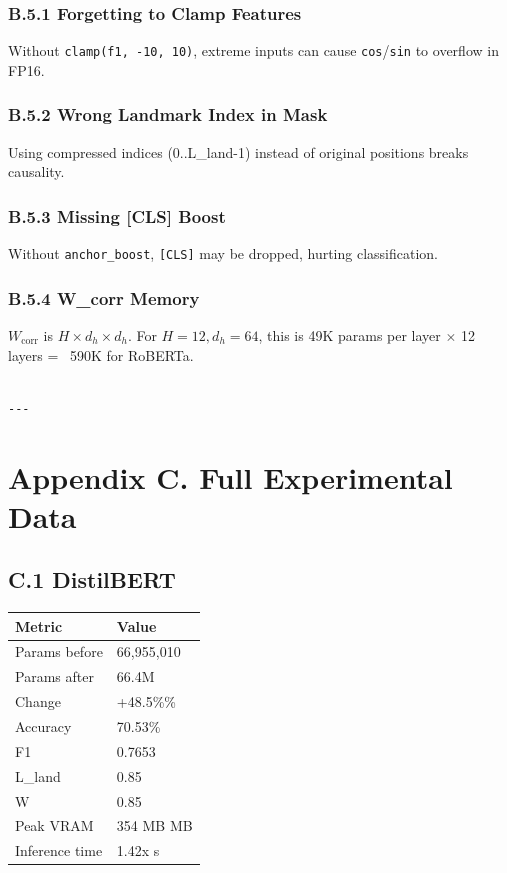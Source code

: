 \subsubsection{B.5.1 Forgetting to Clamp Features}

Without \texttt{clamp(f1, -10, 10)}, extreme inputs can cause \texttt{cos}/\texttt{sin} to 
overflow in FP16.

\subsubsection{B.5.2 Wrong Landmark Index in Mask}

Using compressed indices (0..L\_land-1) instead of original positions 
breaks causality.

\subsubsection{B.5.3 Missing [CLS] Boost}

Without \texttt{anchor\_boost}, \texttt{[CLS]} may be dropped, hurting classification.

\subsubsection{B.5.4 W\_corr Memory}

$W_\text{corr}$ is $H \times d_h \times d_h$. For $H = 12, d_h = 64$, 
this is 49K params per layer $\times$ 12 layers = ~590K for RoBERTa.
\begin{lstlisting}

---
\end{lstlisting}

\section{Appendix C. Full Experimental Data}

\subsection{C.1 DistilBERT}

\begin{table}[H]
\centering
\small
\begin{tabular}{ll}
\toprule
\textbf{Metric} & \textbf{Value} \\
\midrule
Params before & 66,955,010 \\
Params after & 66.4M \\
Change & +48.5\%\% \\
Accuracy & 70.53\% \\
F1 & 0.7653 \\
L\_land & 0.85 \\
W & 0.85 \\
Peak VRAM & 354 MB MB \\
Inference time & 1.42x s \\
\bottomrule
\end{tabular}
\end{table}

